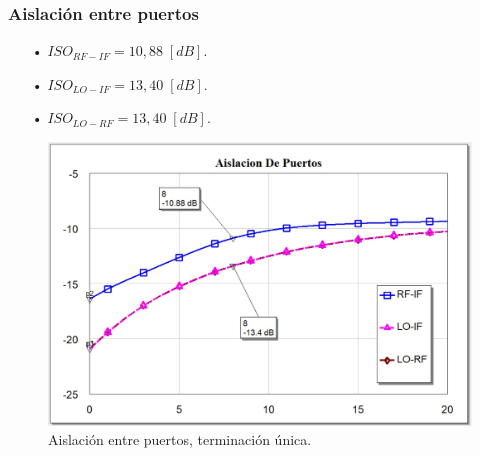 \documentclass[twocolumn]{article}
\begin{document}
\subsubsection{Aislación entre puertos}
%
\begin{itemize}\itemsep0em
\item[•]  $ISO_{RF-IF} = 10,88 \; [dB]$.
\item[•]  $ISO_{LO-IF} = 13,40 \; [dB]$.
\item[•]  $ISO_{LO-RF} = 13,40 \; [dB]$.
\end{itemize}
%
\begin{figure}[h]
  \centering    
	\includegraphics[width=\columnwidth]{imagenes/ISO1.jpg}
	\caption{Aislación entre puertos, terminación única.}\label{fig:ISO1}
\end{figure}
\clearpage
%
\end{document}
